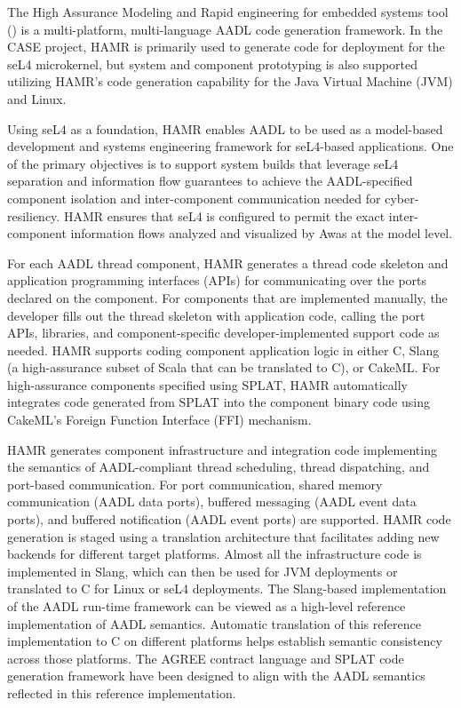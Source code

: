 
The High Assurance Modeling and
Rapid engineering for embedded systems tool (\hamr)
\cite{hamr} is a multi-platform, multi-language
AADL code generation framework.  In the CASE project, HAMR is primarily used
to generate code for deployment for the seL4 microkernel, but system and component
prototyping is also supported utilizing HAMR's code generation capability
for the Java Virtual Machine (JVM) and Linux.  

Using seL4 as a foundation, HAMR enables
AADL to be used as a model-based development and systems
engineering framework for seL4-based applications.
One of the primary objectives is to support system builds that
leverage seL4 separation and information flow
guarantees to achieve the AADL-specified component isolation and
inter-component communication needed for cyber-resiliency.
HAMR ensures that seL4 is configured to permit the exact
inter-component information flows analyzed and visualized by Awas at
the model level.

For each AADL thread component, HAMR generates a thread code
skeleton and application programming interfaces (APIs) for communicating over the ports declared on
the component.  For components that are implemented manually, the
developer fills out the thread skeleton with application code,
calling the port APIs, libraries, and component-specific
developer-implemented support code as needed.
HAMR supports coding component application logic in either C,
Slang~\cite{slang} (a high-assurance subset of Scala that can be translated to
C), or CakeML. 
For high-assurance components specified
using SPLAT, HAMR automatically integrates code generated from
SPLAT into the component binary code using CakeML's Foreign
Function Interface (FFI) mechanism.

HAMR generates component infrastructure and integration code
implementing the semantics of AADL-compliant thread scheduling,
thread dispatching, and port-based communication.
For port communication, shared memory communication (AADL
data ports), buffered messaging (AADL event data ports), and
buffered notification (AADL event ports) are supported.
HAMR code generation is staged using a translation architecture
that facilitates adding new backends for different target
platforms.   Almost all the infrastructure code is implemented
in Slang, which can then be used for JVM deployments or
translated to C for Linux or seL4 deployments.
The Slang-based implementation of the AADL run-time framework
can be viewed as a high-level reference implementation of AADL
semantics.   Automatic translation of this reference
implementation to C on different platforms helps establish
semantic consistency across those platforms. 
The AGREE contract language and SPLAT
code generation framework have been designed to align with the AADL
semantics reflected in this reference implementation.  

